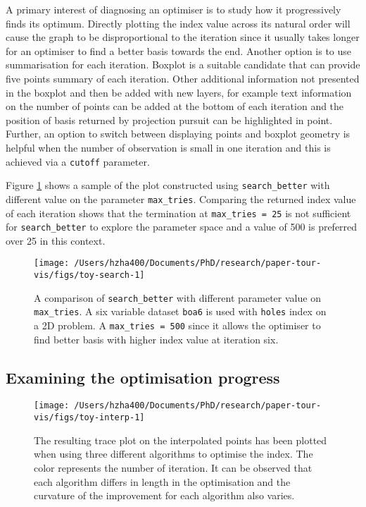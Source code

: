 \documentclass[12pt]{article}
\begin{document}
A primary interest of diagnosing an optimiser is to study how it progressively finds its optimum. Directly plotting the index value across its natural order will cause the graph to be disproportional to the iteration since it usually takes longer for an optimiser to find a better basis towards the end. Another option is to use summarisation for each iteration. Boxplot is a suitable candidate that can provide five points summary of each iteration. Other additional information not presented in the boxplot and then be added with new layers, for example text information on the number of points can be added at the bottom of each iteration and the position of basis returned by projection pursuit can be highlighted in point. Further, an option to switch between displaying points and boxplot geometry is helpful when the number of observation is small in one iteration and this is achieved via a \texttt{cutoff} parameter.

Figure \ref{fig:toy-search} shows a sample of the plot constructed using \texttt{search\_better} with different value on the parameter \texttt{max\_tries}. Comparing the returned index value of each iteration shows that the termination at \texttt{max\_tries\ =\ 25} is not sufficient for \texttt{search\_better} to explore the parameter space and a value of 500 is preferred over 25 in this context.

\begin{figure}

{\centering \texttt{[image: /Users/hzha400/Documents/PhD/research/paper-tour-vis/figs/toy-search-1]} 

}

\caption{A comparison of \texttt{search\_better} with different parameter value on \texttt{max\_tries}. A six variable dataset \texttt{boa6} is used with \texttt{holes} index on a 2D problem. A \texttt{max\_tries\ =\ 500} since it allows the optimiser to find better basis with higher index value at iteration six.}\label{fig:toy-search}
\end{figure}



\hypertarget{toy-interp}{%
\subsection{Examining the optimisation progress}\label{toy-interp}}

\begin{figure}

{\centering \texttt{[image: /Users/hzha400/Documents/PhD/research/paper-tour-vis/figs/toy-interp-1]} 

}

\caption{The resulting trace plot on the interpolated points has been plotted when using three different algorithms to optimise the index. The color represents the number of iteration. It can be observed that each algorithm differs in length in the optimisation and the curvature of the improvement for each algorithm also varies.}\label{fig:toy-interp}
\end{figure}
\end{document}
